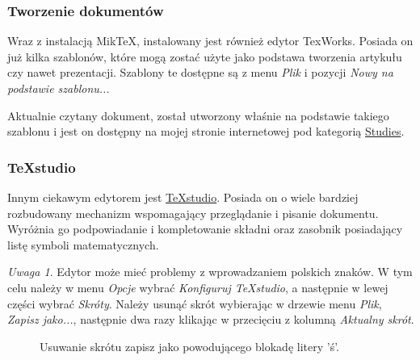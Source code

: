 \documentclass[11pt]{article} %
\theoremstyle{definition}
\theoremstyle{remark}
\newtheorem{remark}{Uwaga}
\begin{document}
\subsubsection{Tworzenie dokumentów}
Wraz z instalacją MikTeX, instalowany jest również edytor TexWorks. Posiada on już kilka szablonów, które mogą zostać użyte jako podstawa tworzenia artykułu czy nawet prezentacji. Szablony te dostępne są z menu \textit{Plik} i pozycji \textit{Nowy na podstawie szablonu...}

Aktualnie czytany dokument, został utworzony właśnie na podstawie takiego szablonu i jest on dostępny na mojej stronie internetowej pod kategorią \href{http://marcindembowski.wordpress.com/category/studies/}{Studies}.

\subsubsection{TeXstudio}
Innym ciekawym edytorem jest \href{http://texstudio.sourceforge.net/}{TeXstudio}. Posiada on o wiele bardziej rozbudowany mechanizm wspomagający przeglądanie i pisanie dokumentu. Wyróżnia go podpowiadanie i kompletowanie składni oraz zasobnik posiadający listę symboli matematycznych.

\begin{remark}
	Edytor może mieć problemy z wprowadzaniem polskich znaków. W tym celu należy w menu \textit{Opcje} wybrać \textit{Konfiguruj TeXstudio}, a następnie w lewej części wybrać \textit{Skróty}. Należy usunąć skrót wybierając w drzewie menu \textit{Plik}, \textit{Zapisz jako...}, następnie dwa razy klikając w przecięciu z kolumną \textit{Aktualny skrót}.

	\begin{figure}[!ht]
		\centering
		\caption{Usuwanie skrótu zapisz jako powodującego blokadę litery 'ś'.}
	\end{figure}
\end{remark}
\end{document}
